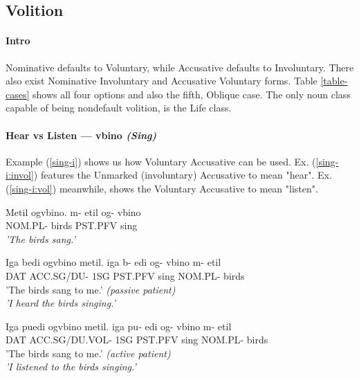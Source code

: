 \documentclass[11pt]{article}
\newcommand{\exref}[1]{(\ref{#1})}
\begin{document}
\subsection{Volition} \label{sec:voluntary}

\paragraph{Intro}
Nominative defaults to Voluntary,
while Accusative defaults to Involuntary.
There also exist Nominative Involuntary
and Accusative Voluntary forms.
Table \ref{table-cases} shows all four options and also the fifth, Oblique case. 
The only noun class capable of being nondefault volition, is the Life class.

\paragraph{Hear vs Listen — vbino \textit{(Sing)}}
Example \exref{sing-i} shows us how Voluntary Accusative can be used.
Ex. \exref{sing-i:invol} features the Unmarked (involuntary) Accusative to mean "hear".
Ex. \exref{sing-i:vol} meanwhile, shows the Voluntary Accusative to mean "listen".

\begin{exe}
\ex \label{sing-i}
\begin{xlist}

\ex \label{sing-i:typei}
Metil ogvbino.
\gll
m-      etil  og-     vbino\\
NOM.PL- birds PST.PFV sing\\
\trans
    \textit{'The birds sang.'}

\ex \label{sing-i:invol}
Iga bedi ogvbino metil.
\gll
iga b-         edi og-     vbino m-      etil \\
DAT ACC.SG/DU- 1SG PST.PFV sing  NOM.PL- birds \\
\trans 
    {\textthin{}'The birds sang to me.' \textit{(passive patient)}}\\
    \textit{'I heard the birds singing.'}

\ex \label{sing-i:vol}
Iga puedi ogvbino metil.
\gll
iga pu-            edi og-     vbino m-      etil \\
DAT ACC.SG/DU.VOL- 1SG PST.PFV sing  NOM.PL- birds \\
\trans 
    {\textthin{}'The birds sang to me.' \textit{(active patient)}}\\
    \textit{'I listened to the birds singing.'}
\end{xlist}
\end{exe}
\end{document}
